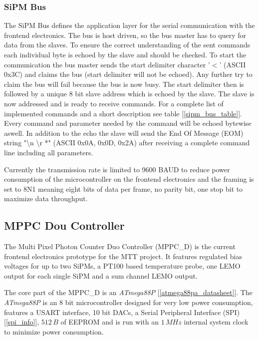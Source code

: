 \subsubsection{SiPM Bus}

The SiPM Bus defines the application layer for the serial communication with the frontend electronics. The bus is host driven, so the bus master has to query for data from the slaves.
To ensure the correct understanding of the sent commands each individual byte is echoed by the slave and should be checked. To start the communication the bus master sends the start
delimiter character '$<$' (ASCII 0x3C) and claims the bus (start delimiter will not be echoed). Any further try to claim the bus will fail because the bus is now busy. 
The start delimiter then is followed by a unique 8 bit slave address which is echoed by the slave. The slave is now addressed and is ready to receive commands. For a complete list of
implemented commands and a short description see table [\ref{sipm_bus_table}]. Every command and parameter needed by the command will be echoed bytewise aswell. In addition to the echo 
the slave will send the End Of Message (EOM) string "\textbackslash n \textbackslash r *" (ASCII 0x0A, 0x0D, 0x2A) after receiving a complete command line including all parameters.

Currently the transmission rate is limited to 9600 BAUD to reduce power consumption of the microcontroller on the frontend electronics and the framing is set to 8N1 meaning eight 
bits of data per frame, no parity bit, one stop bit to maximize data throughput.

\subsection{MPPC Dou Controller}

The Multi Pixel Photon Counter Duo Controller (MPPC\_D) is the current frontend electronics prototype for the MTT project. It features regulated bias voltages for up to two SiPMs, 
a PT100 based temperature probe, one LEMO output for each single SiPM and a sum channel LEMO output.

The core part of the MPPC\_D is an \emph{ATmega88P} [\ref{atmega88pa_datasheet}]. The \emph{ATmega88P} is an 8 bit microcontroller designed for very low power consumption, features a 
USART interface, 10 bit DACs, a Serial Peripheral Interface (SPI) [\ref{spi_info}], $512\,B$ of EEPROM and is run with an $1\,MHz$ internal system clock to minimize power consumption. 

